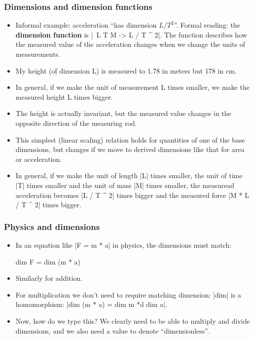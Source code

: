 \documentclass[aspectratio=169]{beamer}
\begin{document}
\begin{frame}
\frametitle{Dimensions and dimension functions}
\begin{itemize}
\item Informal example: acceleration ``has dimension \(L /
  T^2\)''. Formal reading: the \textbf{dimension function}
  is |\ L T M -> L / T ^ 2|. The function describes how the measured
  value of the acceleration changes when we change the units of
  measurements.
\item My height (of dimension L) is measured to 1.78 in meters but 178 in
  cm.
\item In general, if we make the unit of measurement L times smaller,
  we make the measured height L times bigger.
\item The height is actually invariant, but the measured value changes
  in the opposite direction of the measuring rod.
\item This simplest (linear scaling) relation holds for quantities of
  one of the base dimensions, but changes if we move to derived
  dimensions like that for area or acceleration.
\item In general, if we make the unit of length |L| times smaller, the
  unit of time |T| times smaller and the unit of mass |M| times
  smaller, the measuread acceleration becomes |L / T ^ 2| times bigger
  and the measured force |M * L / T ^ 2| times bigger.
\end{itemize}
\end{frame}
\begin{frame}
  \frametitle{Physics and dimensions}
\begin{itemize}
\item In an equation like |F = m * a| %
  in physics, the dimensions must match:
\begin{spec}
dim F = dim (m * a)
\end{spec}
\item Similarly for addition.
\item For multiplication we don't need to require matching dimension:
  |dim| is a homomorphism: |dim (m * a) = dim m *d dim a|.
\item Now, how do we type this? We clearly need to be able to multiply
  and divide dimensions, and we also need a value to denote
  ``dimensionless''.
\end{itemize}
\end{frame}
\end{document}
